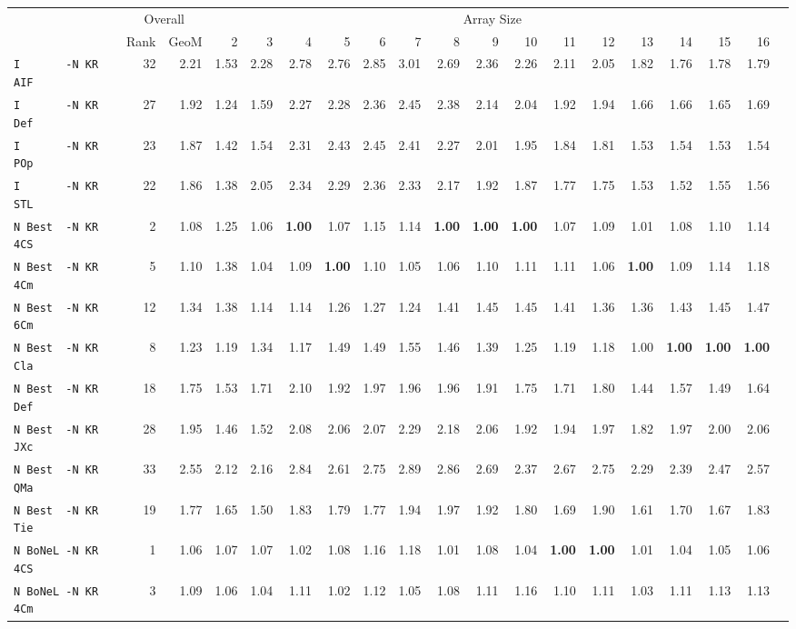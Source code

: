 \begin{tabular}{l | r @{~~} r | r@{~~}r@{~~}r@{~~}r@{~~}r@{~~}r@{~~}r@{~~}r@{~~}r@{~~}r@{~~}r@{~~}r@{~~}r@{~~}r@{~~}r@{~~}r|}
 & \multicolumn{2}{c}{Overall} & \multicolumn{15}{c}{Array Size} \\
 & Rank & GeoM & 2&3&4&5&6&7&8&9&10&11&12&13&14&15&16\\ \hline
\verb+I       -N KR AIF+ & 32 & 2.21 & 1.53&2.28&2.78&2.76&2.85&3.01&2.69&2.36&2.26&2.11&2.05&1.82&1.76&1.78&1.79\\
\verb+I       -N KR Def+ & 27 & 1.92 & 1.24&1.59&2.27&2.28&2.36&2.45&2.38&2.14&2.04&1.92&1.94&1.66&1.66&1.65&1.69\\
\verb+I       -N KR POp+ & 23 & 1.87 & 1.42&1.54&2.31&2.43&2.45&2.41&2.27&2.01&1.95&1.84&1.81&1.53&1.54&1.53&1.54\\
\verb+I       -N KR STL+ & 22 & 1.86 & 1.38&2.05&2.34&2.29&2.36&2.33&2.17&1.92&1.87&1.77&1.75&1.53&1.52&1.55&1.56\\
\verb+N Best  -N KR 4CS+ & 2 & 1.08 & 1.25&1.06&\textbf{1.00}&1.07&1.15&1.14&\textbf{1.00}&\textbf{1.00}&\textbf{1.00}&1.07&1.09&1.01&1.08&1.10&1.14\\
\verb+N Best  -N KR 4Cm+ & 5 & 1.10 & 1.38&1.04&1.09&\textbf{1.00}&1.10&1.05&1.06&1.10&1.11&1.11&1.06&\textbf{1.00}&1.09&1.14&1.18\\
\verb+N Best  -N KR 6Cm+ & 12 & 1.34 & 1.38&1.14&1.14&1.26&1.27&1.24&1.41&1.45&1.45&1.41&1.36&1.36&1.43&1.45&1.47\\
\verb+N Best  -N KR Cla+ & 8 & 1.23 & 1.19&1.34&1.17&1.49&1.49&1.55&1.46&1.39&1.25&1.19&1.18&1.00&\textbf{1.00}&\textbf{1.00}&\textbf{1.00}\\
\verb+N Best  -N KR Def+ & 18 & 1.75 & 1.53&1.71&2.10&1.92&1.97&1.96&1.96&1.91&1.75&1.71&1.80&1.44&1.57&1.49&1.64\\
\verb+N Best  -N KR JXc+ & 28 & 1.95 & 1.46&1.52&2.08&2.06&2.07&2.29&2.18&2.06&1.92&1.94&1.97&1.82&1.97&2.00&2.06\\
\verb+N Best  -N KR QMa+ & 33 & 2.55 & 2.12&2.16&2.84&2.61&2.75&2.89&2.86&2.69&2.37&2.67&2.75&2.29&2.39&2.47&2.57\\
\verb+N Best  -N KR Tie+ & 19 & 1.77 & 1.65&1.50&1.83&1.79&1.77&1.94&1.97&1.92&1.80&1.69&1.90&1.61&1.70&1.67&1.83\\
\verb+N BoNeL -N KR 4CS+ & 1 & 1.06 & 1.07&1.07&1.02&1.08&1.16&1.18&1.01&1.08&1.04&\textbf{1.00}&\textbf{1.00}&1.01&1.04&1.05&1.06\\
\verb+N BoNeL -N KR 4Cm+ & 3 & 1.09 & 1.06&1.04&1.11&1.02&1.12&1.05&1.08&1.11&1.16&1.10&1.11&1.03&1.11&1.13&1.13\\

\end{tabular}
